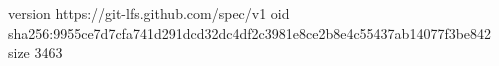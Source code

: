 version https://git-lfs.github.com/spec/v1
oid sha256:9955ce7d7cfa741d291dcd32dc4df2c3981e8ce2b8e4c55437ab14077f3be842
size 3463

